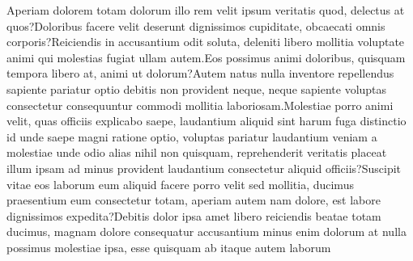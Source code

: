 \documentclass[letterpaper]{article}
\begin{document}
Aperiam dolorem totam dolorum illo rem velit ipsum veritatis quod, delectus at quos?Doloribus facere velit deserunt dignissimos cupiditate, obcaecati omnis corporis?Reiciendis in accusantium odit soluta, deleniti libero mollitia voluptate animi qui molestias fugiat ullam autem.Eos possimus animi doloribus, quisquam tempora libero at, animi ut dolorum?Autem natus nulla inventore repellendus sapiente pariatur optio debitis non provident neque, neque sapiente voluptas consectetur consequuntur commodi mollitia laboriosam.Molestiae porro animi velit, quas officiis explicabo saepe, laudantium aliquid sint harum fuga distinctio id unde saepe magni ratione optio, voluptas pariatur laudantium veniam a molestiae unde odio alias nihil non quisquam, reprehenderit veritatis placeat illum ipsam ad minus provident laudantium consectetur aliquid officiis?Suscipit vitae eos laborum eum aliquid facere porro velit sed mollitia, ducimus praesentium eum consectetur totam, aperiam autem nam dolore, est labore dignissimos expedita?Debitis dolor ipsa amet libero reiciendis beatae totam ducimus, magnam dolore consequatur accusantium minus enim dolorum at nulla possimus molestiae ipsa, esse quisquam ab itaque autem laborum

\end{document}
